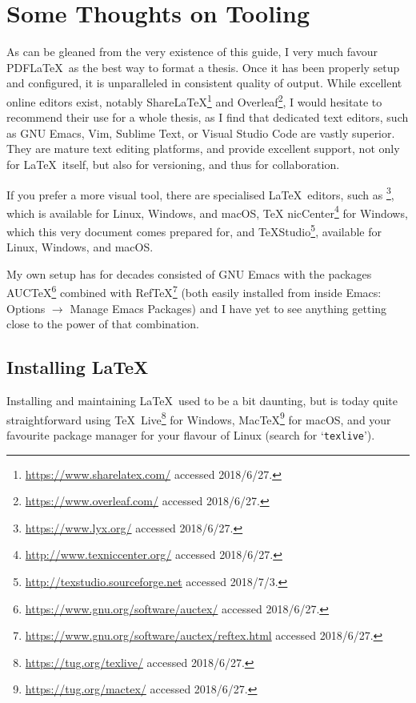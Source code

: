 
\chapter*{Some Thoughts on Tooling}
\label{cha:some-thoughts-tool}


As can be gleaned from the very existence of this guide, I very much
favour PDF\LaTeX\ as the best way to format a thesis. Once it has been
properly setup and configured, it is unparalleled in consistent
quality of output.  While excellent online editors exist, notably
Share\LaTeX\footnote{\url{https://www.sharelatex.com/} accessed 2018/6/27.} and
Overleaf\footnote{\url{https://www.overleaf.com/} accessed 2018/6/27.}, I would hesitate
to recommend their use for a whole thesis, as I find that dedicated
text editors, such as GNU Emacs, Vim, Sublime Text, or Visual Studio
Code are vastly superior.  They are mature text editing platforms, and
provide excellent support, not only for \LaTeX\ itself, but also for
versioning, and thus for collaboration.

If you prefer a more visual tool, there are specialised \LaTeX\
editors, such as \mLyX\footnote{\url{https://www.lyx.org/} accessed
  2018/6/27.}, which is available for Linux, Windows, and macOS, \TeX
nicCenter\footnote{\url{http://www.texniccenter.org/} accessed
  2018/6/27.} for Windows, which this very document comes prepared
for, and \TeX Studio\footnote{\url{http://texstudio.sourceforge.net}
  accessed 2018/7/3.}, available for Linux, Windows, and macOS.

My own setup has for decades consisted of GNU Emacs with the packages
AUC\TeX\footnote{\url{https://www.gnu.org/software/auctex/} accessed 2018/6/27.} combined
with
Ref\TeX\footnote{\url{https://www.gnu.org/software/auctex/reftex.html} accessed 2018/6/27.}
(both easily installed from inside Emacs: Options $\rightarrow$ Manage
Emacs Packages) and I have yet to see anything getting close to the
power of that combination.

\section*{Installing \LaTeX}
\label{sec:installing-latex}

Installing and maintaining \LaTeX\ used to be a bit daunting, but is today
quite straightforward using \TeX\
Live\footnote{\url{https://tug.org/texlive/} accessed 2018/6/27.} for Windows,
Mac\TeX\footnote{\url{https://tug.org/mactex/} accessed 2018/6/27.} for mac\-OS, and your
favourite package manager for your flavour of Linux (search for `\texttt{texlive}').

